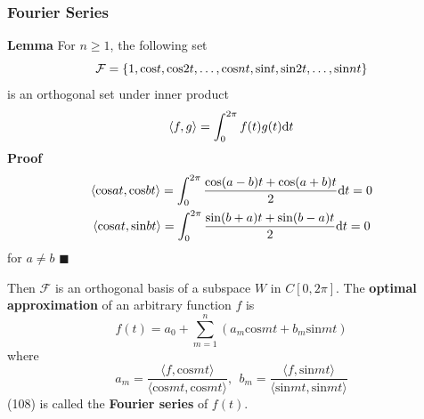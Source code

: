 \documentclass[11pt]{article}
\begin{document}
\subsubsection{Fourier Series}
\noindent \textbf{Lemma} For $n \geq 1$, the following set 
\begin{equation}
    \mathcal{F} = \{ 1, \text{cos}t, \text{cos}2t ,\dots,\text{cos}nt,\text{sin}t,\text{sin}2t,\dots,\text{sin}nt\} \notag
\end{equation}
is an orthogonal set under inner product
\begin{equation}
    \langle f , g\rangle = \int^{2\pi}_{0}f(t)g(t)\text{d}t \notag
\end{equation}
\noindent \textbf{Proof}
\begin{gather}
    \langle \text{cos}at , \text{cos}bt \rangle = \int_{0}^{2\pi}
    \frac{\text{cos}(a-b)t + \text{cos}(a+b)t}{2}\text{d}t = 0 \notag \\
    \langle \text{cos}at , \text{sin}bt \rangle = \int_{0}^{2\pi}
    \frac{\text{sin}(b+a)t + \text{sin}(b-a)t}{2}\text{d}t = 0 \notag
\end{gather}
for $a \neq b$ \hfill $\blacksquare$ \par \noindent
Then $\mathcal{F}$ is an orthogonal basis of a subspace $W$ in $C[0,2\pi]$. The \textbf{optimal approximation} of an arbitrary function $f$ is
\begin{equation}
    f(t) = a_0 + \sum_{m=1}^n (a_m \text{cos}mt + b_m \text{sin}mt )
\end{equation}
where
\begin{equation}
    a_m = \frac{\langle f, \text{cos}mt \rangle}{\langle \text{cos}mt,\text{cos}mt \rangle},~~b_m = \frac{\langle f, \text{sin}mt \rangle}{\langle \text{sin}mt,\text{sin}mt \rangle}
\end{equation}
(108) is called the \textbf{Fourier series} of $f(t)$.
\end{document}
